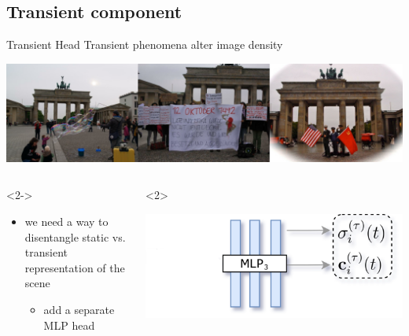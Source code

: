 \documentclass[aspectratio=1610]{beamer}
\begin{document}
\subsection{Transient component}
\begin{frame}{Transient Head}
    Transient phenomena alter image density
    \bigskip
    \begin{center}
        \includegraphics[width=.5\textwidth]{issues-transient.png}
    \end{center}
    \bigskip
    \pause
    \begin{columns}
        \begin{column}{.5\textwidth}
            \begin{onlyenv}<2->
                \begin{itemize}
                    \item we need a way to disentangle static vs. transient representation of the scene
                    \begin{itemize}
                        \item add a separate MLP head
                    \end{itemize}
                \end{itemize}
            \end{onlyenv}
        \end{column}
        \begin{column}{.5\textwidth}
            \begin{onlyenv}<2>
                \begin{center}
                    \includegraphics[width=.9\textwidth]{nerfu-no-t.png}

\end{center}
\end{onlyenv}
\end{column}
\end{columns}
\end{frame}
\end{document}
